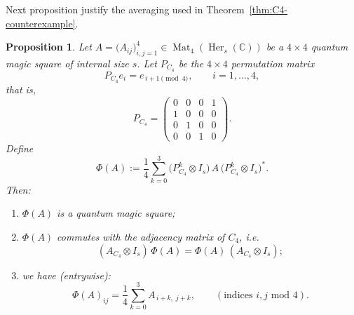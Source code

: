 \documentclass[11pt, a4paper]{article}
\theoremstyle{plain}
\newtheorem{proposition}[theorem]{Proposition}
\theoremstyle{definition}
\theoremstyle{remark}
\newcommand{\C}{\mathbb{C}}
\newcommand{\Her}[2][\C]{\operatorname{Her}_{#2}(#1)}
\begin{document}
Next proposition justify the averaging used in Theorem~\ref{thm:C4-counterexample}.

\begin{proposition}\label{prop:Z4-averaging}
Let \(A=\bigl(A_{ij}\bigr)_{i,j=1}^4 \in \operatorname{Mat}_4(\Her{s})\) be a \(4\times 4\) quantum magic square of internal size \(s\).
Let \(P_{C_4}\) be the \(4\times 4\) permutation matrix
\[
P_{C_4} e_i = e_{\,i+1 \pmod 4}, \qquad i=1,\dots,4,
\]
that is,
\[
P_{C_4} =
\begin{pmatrix}
0 & 0 & 0 & 1\\
1 & 0 & 0 & 0\\
0 & 1 & 0 & 0\\
0 & 0 & 1 & 0
\end{pmatrix}.
\]
Define
\[
\Phi(A) := \frac{1}{4}\sum_{k=0}^{3} 
\bigl(P_{C_4}^{k}\otimes I_s\bigr)\,
A\,
\bigl(P_{C_4}^{k}\otimes I_s\bigr)^{*}.
\]
Then:
\begin{enumerate}
    \item[(i)] \(\Phi(A)\) is a quantum magic square;
    \item[(ii)] \(\Phi(A)\) commutes with the adjacency matrix of \(C_4\), i.e.
    \[
    (A_{C_4}\otimes I_s)\, \Phi(A) = \Phi(A)\, (A_{C_4}\otimes I_s);
    \]
    \item[(iii)]  we have (entrywise):
    \[
    \Phi(A)_{ij}
      = \frac{1}{4}\sum_{k=0}^3 A_{\,i+k,\; j+k},
    \qquad (\text{indices } i,j \text{ mod } 4).
    \]
\end{enumerate}
\end{proposition}
\end{document}
